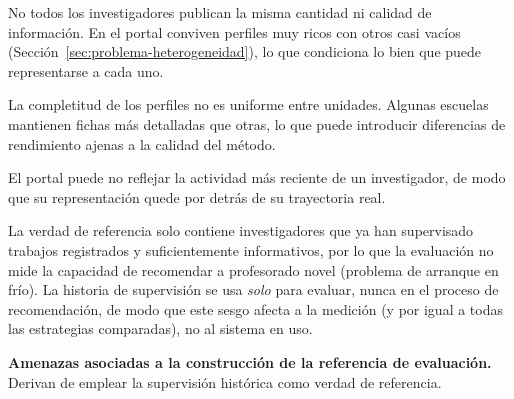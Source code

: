 \begin{mydescription}
    \item[Cobertura incompleta del Portal Científico.]
    No todos los investigadores publican la misma cantidad ni calidad de información.
    En el portal conviven perfiles muy ricos con otros casi vacíos (Sección~\ref{sec:problema-heterogeneidad}), lo que condiciona lo bien que puede representarse a cada uno.
    \item[Heterogeneidad entre escuelas y departamentos.]
    La completitud de los perfiles no es uniforme entre unidades.
    Algunas escuelas mantienen fichas más detalladas que otras, lo que puede introducir diferencias de rendimiento ajenas a la calidad del método.
    \item[Perfiles desactualizados o incompletos.]
    El portal puede no reflejar la actividad más reciente de un investigador, de modo que su representación quede por detrás de su trayectoria real.
    \item[Sesgo de historial observable.]
    La verdad de referencia solo contiene investigadores que ya han supervisado trabajos registrados y suficientemente informativos, por lo que la evaluación no mide la capacidad de recomendar a profesorado novel (problema de arranque en frío).
    La historia de supervisión se usa \emph{solo} para evaluar, nunca en el proceso de recomendación, de modo que este sesgo afecta a la medición (y por igual a todas las estrategias comparadas), no al sistema en uso.
\end{mydescription}

\textbf{Amenazas asociadas a la construcción de la referencia de evaluación.} Derivan de emplear la supervisión histórica como verdad de referencia.

